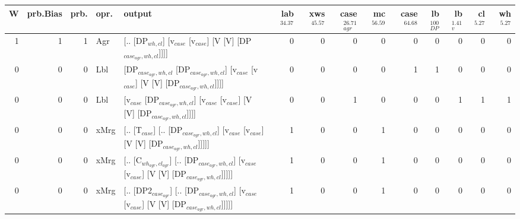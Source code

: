 \begin{tabularx}{\linewidth}{rrrlXrrrrrrrrr}
\hline
   W &   prb.Bias &   prb. & opr.   & output                                                                                                                    &   lab$^{34.37}$ &   xws$^{45.57}$ &   case$_{agr}^{26.71}$ &   mc$^{56.59}$ &   case$^{64.68}$ &   lb$_{DP}^{100}$ &   lb$_{v}^{1.41}$ &   cl$^{5.27}$ &   wh$^{5.27}$ \\
\hline
   1 &       1 &   1 & Agr  & [.. [DP$_{wh,cl}$] [v$_{case}$ [v$_{case}$] [V [V] [DP$_{case_{agr},wh,cl}$]]]]                                                             &             0 &             0 &                  0 &            0 &              0 &                0 &             0 &        0 &        0 \\
   0 &       0 &   0 & Lbl  & [DP$_{case_{agr},wh,cl}$ [DP$_{case_{agr},wh,cl}$] [v$_{case}$ [v$_{case}$] [V [V] [DP$_{case_{agr},wh,cl}$]]]]                                     &             0 &             0 &                  0 &            0 &              1 &                1 &             0 &        0 &        0 \\
   0 &       0 &   0 & Lbl  & [v$_{case}$ [DP$_{case_{agr},wh,cl}$] [v$_{case}$ [v$_{case}$] [V [V] [DP$_{case_{agr},wh,cl}$]]]]                                                &             0 &             0 &                  1 &            0 &              0 &                0 &             1 &        1 &        1 \\
   0 &       0 &   0 & xMrg & [.. [T$_{case}$] [.. [DP$_{case_{agr},wh,cl}$] [v$_{case}$ [v$_{case}$] [V [V] [DP$_{case_{agr},wh,cl}$]]]]]                                      &             1 &             0 &                  0 &            1 &              0 &                0 &             0 &        0 &        0 \\
   0 &       0 &   0 & xMrg & [.. [C$_{wh_{agr},cl_{agr}}$] [.. [DP$_{case_{agr},wh,cl}$] [v$_{case}$ [v$_{case}$] [V [V] [DP$_{case_{agr},wh,cl}$]]]]]                             &             1 &             0 &                  0 &            1 &              0 &                0 &             0 &        0 &        0 \\
   0 &       0 &   0 & xMrg & [.. [DP2$_{case_{agr}}$] [.. [DP$_{case_{agr},wh,cl}$] [v$_{case}$ [v$_{case}$] [V [V] [DP$_{case_{agr},wh,cl}$]]]]]                                &             1 &             0 &                  0 &            1 &              0 &                0 &             0 &        0 &        0 \\

\end{tabularx}
